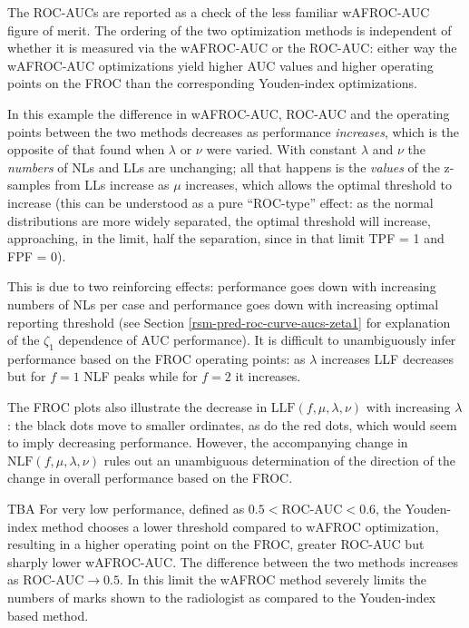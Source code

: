 \documentclass[
]{book}
\begin{document}
The ROC-AUCs are reported as a check of the less familiar wAFROC-AUC figure of merit. The ordering of the two optimization methods is independent of whether it is measured via the wAFROC-AUC or the ROC-AUC: either way the wAFROC-AUC optimizations yield higher AUC values and higher operating points on the FROC than the corresponding Youden-index optimizations.

In this example the difference in wAFROC-AUC, ROC-AUC and the operating points between the two methods decreases as performance \emph{increases}, which is the opposite of that found when \(\lambda\) or \(\nu\) were varied. With constant \(\lambda\) and \(\nu\) the \emph{numbers} of NLs and LLs are unchanging; all that happens is the \emph{values} of the z-samples from LLs increase as \(\mu\) increases, which allows the optimal threshold to increase (this can be understood as a pure ``ROC-type'' effect: as the normal distributions are more widely separated, the optimal threshold will increase, approaching, in the limit, half the separation, since in that limit TPF = 1 and FPF = 0).

This is due to two reinforcing effects: performance goes down with increasing numbers of NLs per case and performance goes down with increasing optimal reporting threshold (see Section \ref{rsm-pred-roc-curve-aucs-zeta1} for explanation of the \(\zeta_1\) dependence of AUC performance). It is difficult to unambiguously infer performance based on the FROC operating points: as \(\lambda\) increases LLF decreases but for \(f = 1\) NLF peaks while for \(f = 2\) it increases.

The FROC plots also illustrate the decrease in \(\text{LLF} \left ( f, \mu, \lambda, \nu \right )\) with increasing \(\lambda\): the black dots move to smaller ordinates, as do the red dots, which would seem to imply decreasing performance. However, the accompanying change in \(\text{NLF} \left ( f, \mu, \lambda, \nu \right )\) rules out an unambiguous determination of the direction of the change in overall performance based on the FROC.

TBA For very low performance, defined as \(0.5 < \text{ROC-AUC} < 0.6\), the Youden-index method chooses a lower threshold compared to wAFROC optimization, resulting in a higher operating point on the FROC, greater ROC-AUC but sharply lower wAFROC-AUC. The difference between the two methods increases as \(\text{ROC-AUC} \rightarrow 0.5\). In this limit the wAFROC method severely limits the numbers of marks shown to the radiologist as compared to the Youden-index based method.
\end{document}
